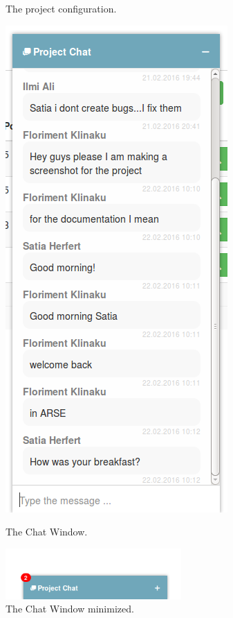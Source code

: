 \documentclass[
	accentcolor=tud1a %
]{tudreport}
\begin{document}
\begin{figure}[ht]
\begin{minipage}{.5\textwidth}
	\caption{The project configuration.}
	\label{fig:project-config}
\end{minipage}%
\begin{minipage}{.5\textwidth}
	\centering
	\includegraphics[height=28EM]{img/chat}
	\caption{The Chat Window.}
	\label{fig:chat}
\end{minipage}
\begin{minipage}{.5\textwidth}
	\centering
	\includegraphics[width=0.6\textwidth]{img/chatNotification}
	\caption{The Chat Window minimized.}
	\label{fig:chat-notification}
\end{minipage}
\end{figure}
\end{document}
